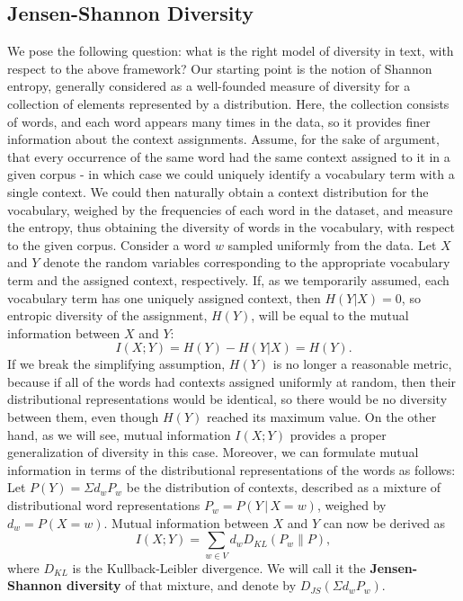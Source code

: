\subsection{Jensen-Shannon Diversity}
\label{sec:jensen-shannon-divergence}
We pose the following question: what is the right model of diversity
in text, with respect to the above framework? %
Our starting point is the notion of Shannon 
entropy, generally considered as a well-founded measure of diversity 
for a collection of elements represented by a
distribution. Here, the collection consists of words, and each word
appears many times in the data, so it provides
finer information about the context assignments. Assume, for the sake
of argument, that every occurrence of the same word had the same
context assigned to it in a given corpus - in which case we could 
uniquely identify a vocabulary term with a single context. We could then naturally obtain a
context distribution for the vocabulary, weighed by the frequencies of
each word in the dataset, and measure the entropy, thus obtaining the
diversity of words in the vocabulary, with respect to the given corpus. Consider a word $w$
sampled uniformly from the data. Let $X$ and $Y$ denote the random
variables corresponding to the 
appropriate vocabulary term and the assigned context,
respectively. If, as we temporarily assumed,
each vocabulary term has one uniquely assigned context, then $H(Y|X)=0$, so entropic diversity of the
assignment, $H(Y)$, will be equal to the mutual information between $X$
and $Y$: 
\[I(X;Y) = H(Y) - H(Y|X) =H(Y).\]
If we break the simplifying assumption, $H(Y)$ is no longer a
reasonable metric, because if all of the words had contexts assigned
uniformly at random, then their distributional representations would be
identical, so there would be no diversity between them, even though $H(Y)$
reached its maximum value. On the other hand, as we will see, mutual
information $I(X;Y)$ provides a proper generalization of diversity in
this case. Moreover, we can formulate mutual information in terms of the
distributional representations of the words as follows:
\bed\label{jsd-definition}
Let $P(Y)=\Sigma d_w P_w$ be the distribution of contexts,
described as a mixture of distributional word representations
$P_w=P(Y\,|\,X\!=\!w)$, weighed by $d_w=P(X=w)$. Mutual information between
$X$ and $Y$ can now be derived as
\[ I(X;Y)= \sum_{w\in V} d_w D_{KL}(P_w\|P),\]
where $D_{KL}$ is the Kullback-Leibler divergence.
We will call it the {\bf Jensen-Shannon diversity} of that
mixture, and denote by $D_{JS}(\Sigma d_wP_w)$.
\eed

